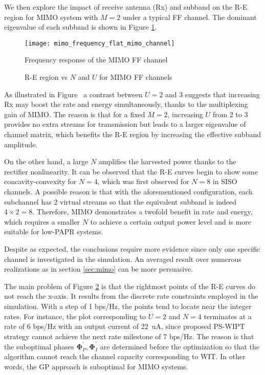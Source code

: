 We then explore the impact of receive antenna (Rx) and subband on the R-E region for MIMO system with $M = 2$ under a typical FF channel. The dominant eigenvalue of each subband is shown in Figure \ref{fig:mimo-channels}.

\begin{figure}
  \centering
  \texttt{[image: mimo\_frequency\_flat\_mimo\_channel]}
  \caption{Frequency response of the MIMO FF channel}\label{fig:mimo-channels}
\end{figure}

\begin{figure}[ht]
  \centering
  \caption{R-E region vs $N$ and $U$ for MIMO FF channels}
  \label{fig:re-mimo}
\end{figure}

As illustrated in Figure \, a contrast between $U = 2$ and 3 suggests that increasing Rx may boost the rate and energy simultaneously, thanks to the multiplexing gain of MIMO. The reason is that for a fixed $M = 2$, increasing $U$ from 2 to 3 provides no extra streams for transmission but leads to a larger eigenvalue of channel matrix, which benefits the R-E region by increasing the effective subband amplitude.

On the other hand, a large $N$ amplifies the harvested power thanks to the rectifier nonlinearity. It can be observed that the R-E curves begin to show some concavity-convexity for $N = 4$, which was first observed for $N = 8$ in SISO channels. A possible reason is that with the aforementioned configuration, each subchannel has 2 virtual streams so that the equivalent subband is indeed $4 \times 2 = 8$. Therefore, MIMO demonstrates a twofold benefit in rate and energy, which requires a smaller $N$ to achieve a certain output power level and is more suitable for low-PAPR systems.

Despite as expected, the conclusions require more evidence since only one specific channel is investigated in the simulation. An averaged result over numerous realizations as in section \ref{sec:mimo} can be more persuasive.

The main problem of Figure \ref{fig:re-mimo} is that the rightmost points of the R-E curves do not reach the x-axis. It results from the discrete rate constraints employed in the simulation. With a step of 1 bps/Hz, the points tend to locate near the integer rates. For instance, the plot corresponding to $U = 2$ and $N = 4$ terminates at a rate of 6 bps/Hz with an output current of \SI{22}{uA}, since proposed PS-WIPT strategy cannot achieve the next rate milestone of 7 bps/Hz. The reason is that the suboptimal phases ${{\mathbf{\Phi }}_P^\prime ,{\mathbf{\Phi }}_I^\prime }$ are determined before the optimization so that the algorithm cannot reach the channel capacity corresponding to WIT. In other words, the GP approach is suboptimal for MIMO systems. 

